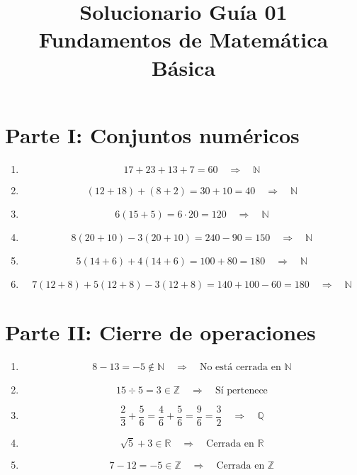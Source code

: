 \documentclass[12pt]{article}
\title{\textbf{Solucionario Guía 01}\\
	Fundamentos de Matemática Básica}
\author{}
\date{}
\begin{document}
	
	\maketitle
	
	\section*{Parte I: Conjuntos numéricos}
	
	\begin{enumerate}
		
		\item 
		\[
		17+23+13+7=60 \quad \Rightarrow \quad \boxed{\mathbb{N}}
		\]
		
		\item 
		\[
		(12+18)+(8+2)=30+10=40 \quad \Rightarrow \quad \boxed{\mathbb{N}}
		\]
		
		\item 
		\[
		6(15+5)=6\cdot 20=120 \quad \Rightarrow \quad \boxed{\mathbb{N}}
		\]
		
		\item 
		\[
		8(20+10)-3(20+10)=240-90=150 \quad \Rightarrow \quad \boxed{\mathbb{N}}
		\]
		
		\item 
		\[
		5(14+6)+4(14+6)=100+80=180 \quad \Rightarrow \quad \boxed{\mathbb{N}}
		\]
		
		\item 
		\[
		7(12+8)+5(12+8)-3(12+8)=140+100-60=180 \quad \Rightarrow \quad \boxed{\mathbb{N}}
		\]
		
	\end{enumerate}
	
	\section*{Parte II: Cierre de operaciones}
	
	\begin{enumerate}
		
		\item 
		\[
		8-13=-5 \notin \mathbb{N}
		\quad \Rightarrow \quad \boxed{\text{No está cerrada en } \mathbb{N}}
		\]
		
		\item 
		\[
		15 \div 5=3 \in \mathbb{Z}
		\quad \Rightarrow \quad \boxed{\text{Sí pertenece}}
		\]
		
		\item 
		\[
		\frac{2}{3}+\frac{5}{6}=\frac{4}{6}+\frac{5}{6}=\frac{9}{6}=\frac{3}{2}
		\quad \Rightarrow \quad \boxed{\mathbb{Q}}
		\]
		
		\item 
		\[
		\sqrt{5}+3 \in \mathbb{R}
		\quad \Rightarrow \quad \boxed{\text{Cerrada en } \mathbb{R}}
		\]
		
		\item 
		\[
		7-12=-5 \in \mathbb{Z}
		\quad \Rightarrow \quad \boxed{\text{Cerrada en } \mathbb{Z}}
		\]
		
	\end{enumerate}
	
\end{document}
